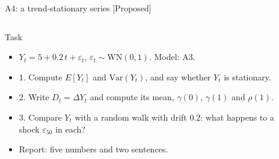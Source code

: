\begin{frame}{A4: a trend-stationary series [Proposed]}
\propsub
\itemsize{\scriptsize}
\begin{columns}[T]
\begin{column}{\taskw}
\begin{block}{Task}
\begin{itemize}
    \item $Y_t = 5 + 0.2\,t + \varepsilon_t$, $\varepsilon_t \sim \mathrm{WN}(0, 1)$. Model: A3.
    \item 1. Compute $E[Y_t]$ and $\mathrm{Var}(Y_t)$, and say whether $Y_t$ is stationary.
    \item 2. Write $D_t = \Delta Y_t$ and compute its mean, $\gamma(0)$, $\gamma(1)$ and $\rho(1)$.
    \item 3. Compare $Y_t$ with a random walk with drift $0.2$: what happens to a shock $\varepsilon_{50}$ in each?
    \item Report: five numbers and two sentences.
\end{itemize}
\end{block}
\end{column}
\begin{column}{\solw}
\end{column}
\end{columns}
\end{frame}

